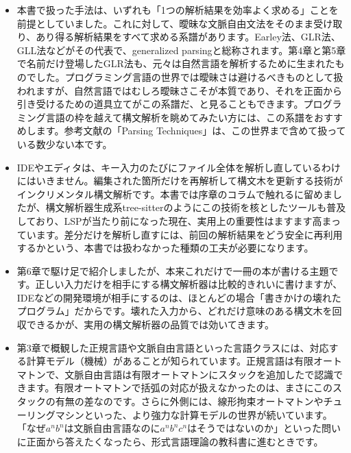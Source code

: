\begin{itemize}
\item

  本書で扱った手法は、いずれも「1つの解析結果を効率よく求める」ことを前提としていました。これに対して、曖昧な文脈自由文法をそのまま受け取り、あり得る解析結果をすべて求める系譜があります。Earley法、GLR法、GLL法などがその代表で、generalized parsingと総称されます。第4章と第5章で名前だけ登場したGLR法も、元々は自然言語を解析するために生まれたものでした。プログラミング言語の世界では曖昧さは避けるべきものとして扱われますが、自然言語ではむしろ曖昧さこそが本質であり、それを正面から引き受けるための道具立てがこの系譜だ、と見ることもできます。プログラミング言語の枠を越えて構文解析を眺めてみたい方には、この系譜をおすすめします。参考文献の「Parsing Techniques」は、この世界まで含めて扱っている数少ない本です。

\item

  IDEやエディタは、キー入力のたびにファイル全体を解析し直しているわけにはいきません。編集された箇所だけを再解析して構文木を更新する技術がインクリメンタル構文解析です。本書では序章のコラムで触れるに留めましたが、構文解析器生成系tree-sitterのようにこの技術を核としたツールも普及しており、LSPが当たり前になった現在、実用上の重要性はますます高まっています。差分だけを解析し直すには、前回の解析結果をどう安全に再利用するかという、本書では扱わなかった種類の工夫が必要になります。

\item

  第6章で駆け足で紹介しましたが、本来これだけで一冊の本が書ける主題です。正しい入力だけを相手にする構文解析器は比較的きれいに書けますが、IDEなどの開発環境が相手にするのは、ほとんどの場合「書きかけの壊れたプログラム」だからです。壊れた入力から、どれだけ意味のある構文木を回収できるかが、実用の構文解析器の品質では効いてきます。

\item

  第3章で概観した正規言語や文脈自由言語といった言語クラスには、対応する計算モデル（機械）があることが知られています。正規言語は有限オートマトンで、文脈自由言語は有限オートマトンにスタックを追加したで認識できます。有限オートマトンで括弧の対応が扱えなかったのは、まさにこのスタックの有無の差なのです。さらに外側には、線形拘束オートマトンやチューリングマシンといった、より強力な計算モデルの世界が続いています。「なぜ\(a^n b^n\)は文脈自由言語なのに\(a^n b^n c^n\)はそうではないのか」といった問いに正面から答えたくなったら、形式言語理論の教科書に進むときです。

\end{itemize}

